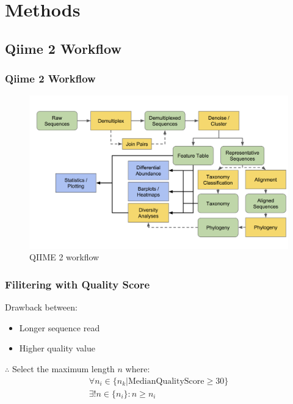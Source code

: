\documentclass{beamer}
\begin{document}
    \section{Methods}
    \subsection{Qiime 2 Workflow}
    \begin{frame}
        \frametitle{Qiime 2 Workflow}

        \begin{figure}
            \includegraphics[width=0.8 \linewidth]{figures/qiime.png}
            \caption{QIIME 2 workflow \protect\cite{qiime1, qiime2, qiime3}}
        \end{figure}
    \end{frame}

    \begin{frame}
        \frametitle{Filitering with Quality Score}

        Drawback between:
        \begin{itemize}
            \item Longer sequence read
            \item Higher quality value
        \end{itemize}

        $\therefore$ Select the maximum length $n$ where:
        \begin{equation}
            \begin{array}{c}
                \forall n_i \in \{ n_k | \mbox{MedianQualityScore} \geq 30 \} \\
                \exists ! n \in \{n_i\} : n \geq n_i
            \end{array}
        \end{equation}
    \end{frame}
\end{document}
